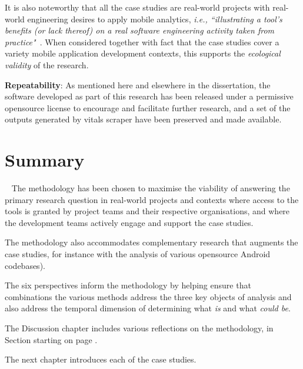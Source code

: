  It is also noteworthy that all the case studies  are real-world projects with real-world engineering desires to apply mobile analytics, \emph{i.e., ``illustrating a tool’s benefits (or lack thereof) on a real software engineering activity taken from practice"}~. When considered together with fact that the case studies cover a variety mobile application development contexts, this supports the \emph{ecological validity} of the research.

\textbf{Repeatability}:
As mentioned here and elsewhere in the dissertation, the software developed as part of this research has been released under a permissive opensource license to encourage and facilitate further research, and a set of the outputs generated by vitals scraper have been preserved and made available.


\section[Summary of the methodology chapter]{Summary}~\label{methodology-summary-section}
The methodology has been chosen to maximise the viability of answering the primary research question in real-world projects and contexts where access to the tools is granted by project teams and their respective organisations, and where the development teams actively engage and support the case studies.

The methodology also accommodates complementary research that augments the case studies, for instance with the analysis of various opensource Android codebases).

The six perspectives inform the methodology by helping ensure that combinations the various methods address the three key objects of analysis and also address the temporal dimension of determining what \textit{is} and what \textit{could be}.

The Discussion chapter includes various reflections on the methodology, in Section  starting on page \pageref{discussion-on-methodology-and-case-study-procedure}.

The next chapter introduces each of the case studies.
